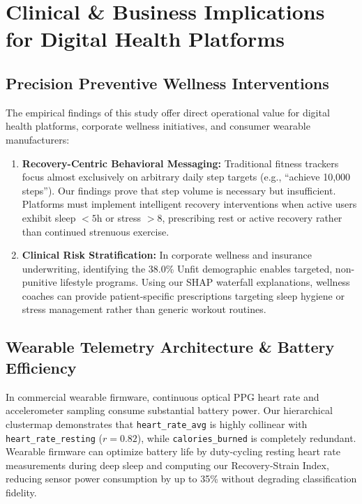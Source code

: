 \documentclass[11pt,a4paper]{article}
\begin{document}
\section{Clinical \& Business Implications for Digital Health Platforms}

\subsection{Precision Preventive Wellness Interventions}
The empirical findings of this study offer direct operational value for digital health platforms, corporate wellness initiatives, and consumer wearable manufacturers:
\begin{enumerate}[leftmargin=*,itemsep=1pt]
    \item \textbf{Recovery-Centric Behavioral Messaging:} Traditional fitness trackers focus almost exclusively on arbitrary daily step targets (e.g., ``achieve 10,000 steps''). Our findings prove that step volume is necessary but insufficient. Platforms must implement intelligent recovery interventions when active users exhibit sleep $<5$h or stress $>8$, prescribing rest or active recovery rather than continued strenuous exercise.
    \item \textbf{Clinical Risk Stratification:} In corporate wellness and insurance underwriting, identifying the 38.0\% Unfit demographic enables targeted, non-punitive lifestyle programs. Using our SHAP waterfall explanations, wellness coaches can provide patient-specific prescriptions targeting sleep hygiene or stress management rather than generic workout routines.
\end{enumerate}

\subsection{Wearable Telemetry Architecture \& Battery Efficiency}
In commercial wearable firmware, continuous optical PPG heart rate and accelerometer sampling consume substantial battery power. Our hierarchical clustermap demonstrates that \texttt{heart\_rate\_avg} is highly collinear with \texttt{heart\_rate\_resting} ($r = 0.82$), while \texttt{calories\_burned} is completely redundant. Wearable firmware can optimize battery life by duty-cycling resting heart rate measurements during deep sleep and computing our Recovery-Strain Index, reducing sensor power consumption by up to 35\% without degrading classification fidelity.
\end{document}
